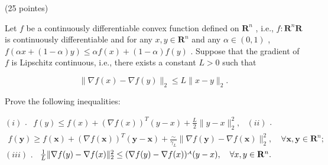\begin{exercise}
\label{applied:2019:8}
(25 pointes)

Let $f$ be a continuously differentiable convex function defined on $\mathbf { R } ^ { n }$ , i.e., $f : \mathbf { R } ^ { n }  \mathbf { R }$ is continuously differentiable and for any $x , y \in \mathbf { R } ^ { n }$ and any $\alpha \in ( 0 , 1 )$ , $f ( \alpha x + ( 1 - \alpha ) y ) \leq \alpha f ( x ) + ( 1 - \alpha ) f ( y )$ . Suppose that the gradient of $f$ is Lipschitz continuous, i.e., there exists a constant $L > 0$ such that

\[
\| \nabla f (x) - \nabla f (y) \| _ {2} \leq L \| x - y \| _ {2}.
\]

Prove the following inequalities:

$( i )$ . $\begin{array} { r } { f ( y ) \leq f ( x ) + ( \nabla f ( x ) ) ^ { T } ( y - x ) + \frac { L } { 2 } \| y - x \| _ { 2 } ^ { 2 } , } \end{array}$   
$( i i )$ . $\begin{array} { r } { f ( \boldsymbol { y } ) \ge f ( \boldsymbol { x } ) + ( \nabla f ( \boldsymbol { x } ) ) ^ { T } ( \boldsymbol { y } - \boldsymbol { x } ) + \frac { \sim } { \gamma _ { L } } \| \nabla f ( \boldsymbol { y } ) - \nabla f ( \boldsymbol { x } ) \| _ { 2 } ^ { 2 } , \quad \forall \boldsymbol { x } , \boldsymbol { y } \in \mathbf { R } ^ { n } ; } \end{array}$   
$( i i i )$ . $\begin{array} { r } { \frac { 1 } { L } \| \nabla f ( y ) - \nabla f ( x ) \| _ { 2 } ^ { 2 } \leq ( \nabla f ( y ) - \nabla f ( x ) ) ^ { \scriptscriptstyle { \cal A } } ( y - x ) , \quad \forall x , y \in { \bf R } ^ { n } . } \end{array}$
\end{exercise}

